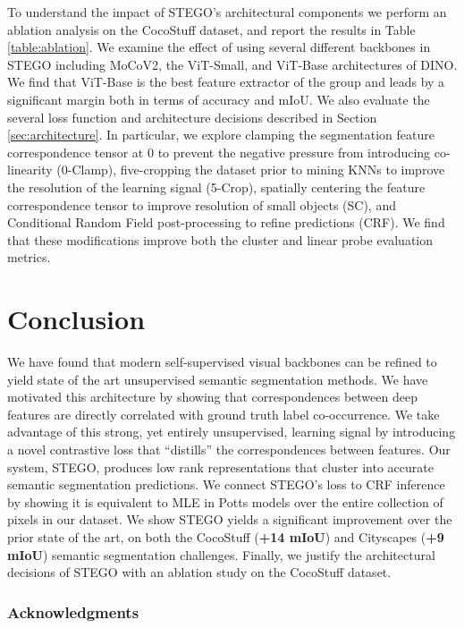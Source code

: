 \documentclass{article} \usepackage{iclr2022_conference,times}
\begin{document}
To understand the impact of STEGO's architectural components we perform an ablation analysis on the CocoStuff dataset, and report the results in Table \ref{table:ablation}. We examine the effect of using several different backbones in STEGO including MoCoV2, the ViT-Small, and ViT-Base architectures of DINO. We find that ViT-Base is the best feature extractor of the group and leads by a significant margin both in terms of accuracy and mIoU. We also evaluate the several loss function and architecture decisions described in Section \ref{sec:architecture}. In particular, we explore clamping the segmentation feature correspondence tensor at $0$ to prevent the negative pressure from introducing co-linearity (0-Clamp), five-cropping the dataset prior to mining KNNs to improve the resolution of the learning signal (5-Crop), spatially centering the feature correspondence tensor to improve resolution of small objects (SC), and Conditional Random Field post-processing to refine predictions (CRF). We find that these modifications improve both the cluster and linear probe evaluation metrics. 

\vspace{-.1in}
\section{Conclusion}
\vspace{-.1in}

We have found that modern self-supervised visual backbones can be refined to yield state of the art unsupervised semantic segmentation methods. We have motivated this architecture by showing that correspondences between deep features are directly correlated with ground truth label co-occurrence. We take advantage of this strong, yet entirely unsupervised, learning signal by introducing a novel contrastive loss that ``distills'' the correspondences between features. Our system, STEGO, produces low rank representations that cluster into accurate semantic segmentation predictions. We connect STEGO's loss to CRF inference by showing it is equivalent to MLE in Potts models over the entire collection of pixels in our dataset. We show STEGO yields a significant improvement over the prior state of the art, on both the CocoStuff (\textbf{+14 mIoU}) and Cityscapes (\textbf{+9 mIoU}) semantic segmentation challenges. Finally, we justify the architectural decisions of STEGO with an ablation study on the CocoStuff dataset. 


\subsubsection*{Acknowledgments}
\end{document}
